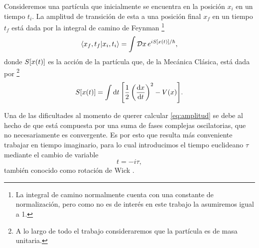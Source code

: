 Consideremos una partícula que inicialmente se encuentra en la posición $x_i$ en un tiempo $t_i$. La amplitud de transición de esta a una posición final $x_f$ en un tiempo $t_f$ está dada por la integral de camino de Feynman \footnote{La integral de camino normalmente cuenta con una constante de normalización, pero como no es de interés en este trabajo la asumiremos igual a 1.} \cite{feynman2010quantum}
\begin{equation}\label{eq:amplitud}
\bra{x_f, t_f}\ket{x_i, t_i} = \int \mathcal{D}x \, e^{iS\qty[x \qty(t)]/\hbar},
\end{equation}
donde $S\qty[x \qty(t)]$ es la acción de la partícula que, de la Mecánica Clásica, está dada por \footnote{A lo largo de todo el trabajo consideraremos que la partícula es de masa unitaria.}
\begin{equation}
S\qty[x \qty(t)] = \int \dd{t} \qty[\frac{1}{2} \left(\dv{x}{t}\right)^2 - V\qty(x)]. \label{eq:accion}
\end{equation}

Una de las dificultades al momento de querer calcular \eqref{eq:amplitud} se debe al hecho de que está compuesta por una suma de fases complejas oscilatorias, que no necesariamente es convergente. Es por esto que resulta más conveniente trabajar en tiempo imaginario, para lo cual introducimos el tiempo euclideano $\tau$ mediante el cambio de variable
\begin{equation} \label{eq:tiempo_im}
	t = -i\tau, 
\end{equation} 
también conocido como rotación de Wick \cite{das2006field}. %

